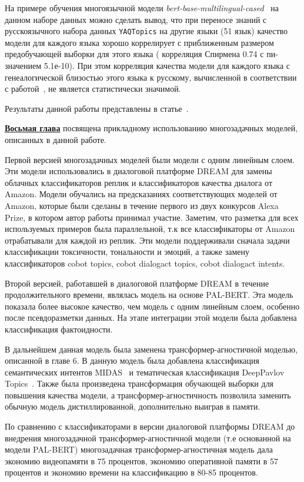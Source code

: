 На примере обучения многоязычной модели \textit{bert-base-multilingual-cased}~\cite{devlin_2018} на данном наборе данных можно сделать вывод, что при переносе знаний с русскоязычного набора данных \texttt{YAQTopics} на другие языки (51 язык) качество модели для каждого языка хорошо коррелирует с приближенным размером предобучающей выборки для этого языка ( корреляция Спирмена 0.74 с пи-значением 5.1е-10). При этом корреляция качества модели для каждого языка с генеалогической близостью этого языка к русскому, вычисленной в соответствии с работой~\cite{langsim}, не является статистически значимой.

Результаты данной работы представлены в статье~\cite{rutopics}.

\underline{\textbf{Восьмая глава}} посвящена прикладному использованию многозадачных моделей, описанных в данной работе.

Первой версией многозадачных моделей были модели с одним линейным слоем. Эти модели использовались в диалоговой платформе DREAM для замены облачных классификаторов реплик и классификаторов качества диалога от Amazon. Модели обучались на предсказаниях соответствующих моделей от Amazon, которые были сделаны в течение первого из двух конкурсов Alexa Prize, в котором автор работы принимал участие. Заметим, что разметка для всех используемых примеров была параллельной, т.к все классификаторы от Amazon отрабатывали для каждой из реплик. Эти модели поддерживали сначала задачи классификации токсичности, тональности и эмоций, а также замену классификаторов cobot topics, cobot dialogact topics, cobot dialogact intents.

Второй версией, работавшей в диалоговой платформе DREAM в течение продолжительного времени, являлась модель на основе PAL-BERT. Эта модель показала более высокое качество, чем модель с одним линейным слоем, особенно после псевдоразметки данных. На этапе интеграции этой модели была добавлена классификация фактоидности. 

В дальнейшем данная модель была заменена трансформер-агностичной моделью, описанной в главе 6. В данную модель была добавлена классификация семантических интентов MIDAS~\cite{midas} и тематическая классификация DeepPavlov Topics~\cite{dp_topics}. Также была произведена трансформация обучающей выборки для повышения качества модели, а трансформер-агностичность позволила заменить обычную модель дистиллированной, дополнительно выиграв в памяти.

По сравнению с классификаторами в версии диалоговой платформы DREAM до внедрения многозадачной трансформер-агностичной модели (т.е основанной на модели PAL-BERT) многозадачная трансформер-агностичная модель дала экономию видеопамяти в 75 процентов, экономию оперативной памяти в 57 процентов и экономию времени на классификацию в 80-85 процентов.
 
